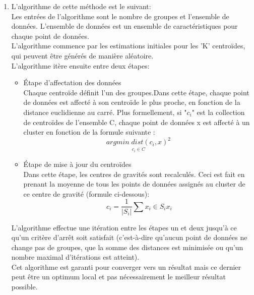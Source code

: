 \begin{enumerate}

\item L’algorithme de cette méthode \cite{28} est le suivant:\\ 

Les entrées de l'algorithme sont le nombre de groupes et l'ensemble de données. L'ensemble de données est un ensemble de caractéristiques pour chaque point de données.\\
L’algorithme commence par les estimations initiales pour les 'Κ' centroïdes, qui peuvent être générés de manière aléatoire.\\ 
L'algorithme itère ensuite entre deux étapes:

\begin{itemize}
    \item Étape d’affectation des données\\
Chaque centroïde définit l'un des groupes.Dans cette étape, chaque point de données est affecté à son centroïde le plus proche, en fonction de la distance euclidienne au carré. Plus formellement, si  "$c_i$" est la collection de centroïdes de l’ensemble C, chaque point de données x est affecté à un cluster en fonction de la formule suivante :
\[\underset{c_i \in C}{argmin \; dist\left (c_i,x\right )^2}\] 
\item Étape de mise à jour du centroïdes\\
Dans cette étape, les centres de gravités sont recalculés. Ceci est fait en prenant la moyenne de tous les points de données assignés au cluster de ce centre de gravité (formule ci-dessous):\\

\[ \ c_i=\frac{1}{|S_i|}\sum{x_i \in S_i x_i }\]
\end{itemize}
L'algorithme effectue une itération entre les étapes un et deux jusqu'à ce qu'un critère d'arrêt soit satisfait (c'est-à-dire qu'aucun point de données ne change pas de groupes, que la somme des distances est minimisée ou qu'un nombre maximal d'itérations est atteint).\\
Cet algorithme est garanti pour converger vers un résultat mais ce dernier peut être un optimum local et pas nécessairement le meilleur résultat possible.


\end{enumerate}

